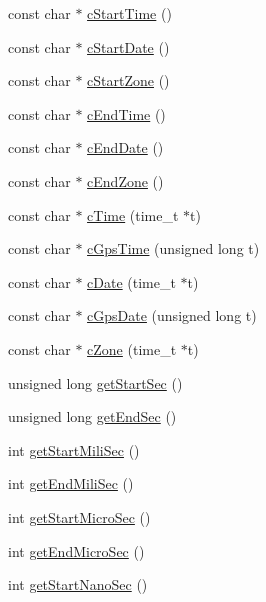 \begin{DoxyCompactItemize}
\item 
const char $\ast$ \hyperlink{classprocDuration_ac005d66386a1dbb62e3d44dc06bab413}{c\-Start\-Time} ()
\item 
const char $\ast$ \hyperlink{classprocDuration_a1d0dab0ad00cd0adaec2beeb4754f2c1}{c\-Start\-Date} ()
\item 
const char $\ast$ \hyperlink{classprocDuration_aa6205795755ce1afdc3bc21dc96626e6}{c\-Start\-Zone} ()
\item 
const char $\ast$ \hyperlink{classprocDuration_a1aaa4d88d842e25ecbd3100c243796b6}{c\-End\-Time} ()
\item 
const char $\ast$ \hyperlink{classprocDuration_a45a2a3f05abad948d0a0e02e8e701ee3}{c\-End\-Date} ()
\item 
const char $\ast$ \hyperlink{classprocDuration_a28dc26f35d7e65394ee4758e2f9ab4c2}{c\-End\-Zone} ()
\item 
const char $\ast$ \hyperlink{classprocDuration_a1931042a18fac844d42cddf44101ef1e}{c\-Time} (time\-\_\-t $\ast$t)
\item 
const char $\ast$ \hyperlink{classprocDuration_a14c8907362b99a94d58f728ef024cd11}{c\-Gps\-Time} (unsigned long t)
\item 
const char $\ast$ \hyperlink{classprocDuration_a2b2ae30be812cb87c4dddeeefa9b78ad}{c\-Date} (time\-\_\-t $\ast$t)
\item 
const char $\ast$ \hyperlink{classprocDuration_a36b4b38f8275d9f5ecaf0a014d76f270}{c\-Gps\-Date} (unsigned long t)
\item 
const char $\ast$ \hyperlink{classprocDuration_afb0f7f2e14396c267acb338ba9ca597c}{c\-Zone} (time\-\_\-t $\ast$t)
\item 
unsigned long \hyperlink{classprocDuration_a760b8c8e6a76d51d22a8324920decadd}{get\-Start\-Sec} ()
\item 
unsigned long \hyperlink{classprocDuration_ae3358cdbb46bb778c4d0ccc000dab225}{get\-End\-Sec} ()
\item 
int \hyperlink{classprocDuration_ad15610a1b1998ef5d8923b041b3db153}{get\-Start\-Mili\-Sec} ()
\item 
int \hyperlink{classprocDuration_a66f7237d8ed5b63bd55964de89ebe5a6}{get\-End\-Mili\-Sec} ()
\item 
int \hyperlink{classprocDuration_ac1078f747a8c57360139962a6078fa2d}{get\-Start\-Micro\-Sec} ()
\item 
int \hyperlink{classprocDuration_abfb741c499aaa8e0a12f86ebb82df652}{get\-End\-Micro\-Sec} ()
\item 
int \hyperlink{classprocDuration_aff2364afd00b3c12e6143cf0dfb6980f}{get\-Start\-Nano\-Sec} ()

\end{DoxyCompactItemize}
